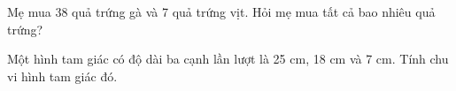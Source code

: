 \begin{ex} %
Mẹ mua 38 quả trứng gà và 7 quả trứng vịt. Hỏi mẹ mua tất cả bao nhiêu quả trứng?
\end{ex}

\begin{ex} %
Một hình tam giác có độ dài ba cạnh lần lượt là 25 cm, 18 cm và 7 cm. Tính chu vi hình tam giác đó.
\end{ex}
